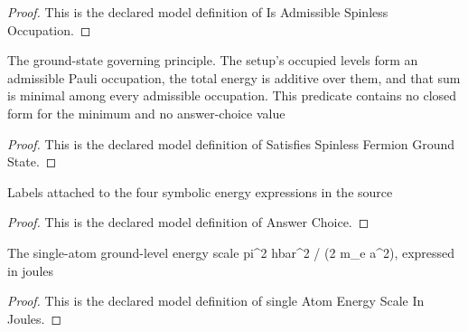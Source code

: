 \begin{proof}
  This is the declared model definition of Is Admissible Spinless Occupation.
\end{proof}
\begin{definition}
  \label{def:physics:phyx-mini-0603:phyxminiproblems-problemphyxmini0603-satisfiesspinlessfermiongroundstate}
  The ground-state governing principle. The setup's occupied levels form an admissible Pauli occupation, the total energy is additive over them, and that sum is minimal among every admissible occupation. This predicate contains no closed form for the minimum and no answer-choice value
\end{definition}
\begin{proof}
  This is the declared model definition of Satisfies Spinless Fermion Ground State.
\end{proof}
\begin{definition}
  \label{def:physics:phyx-mini-0603:phyxminiproblems-problemphyxmini0603-answerchoice}
  Labels attached to the four symbolic energy expressions in the source
\end{definition}
\begin{proof}
  This is the declared model definition of Answer Choice.
\end{proof}
\begin{definition}
  \label{def:physics:phyx-mini-0603:phyxminiproblems-problemphyxmini0603-singleatomenergyscaleinjoules}
  The single-atom ground-level energy scale pi\textasciicircum{}2 hbar\textasciicircum{}2 / (2 m\_e a\textasciicircum{}2), expressed in joules
\end{definition}
\begin{proof}
  This is the declared model definition of single Atom Energy Scale In Joules.
\end{proof}
